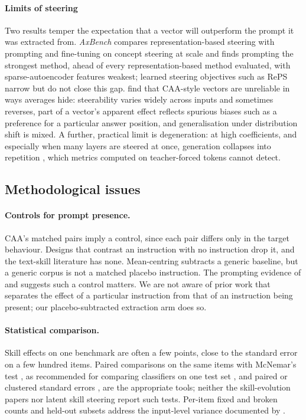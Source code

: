 \documentclass[11pt]{article}
\begin{document}
\paragraph{Limits of steering} Two results temper the expectation that a vector will outperform the
prompt it was extracted from. \emph{AxBench} \citep{wu2025axbench} compares representation-based
steering with prompting and fine-tuning on concept steering at scale and finds prompting the
strongest method, ahead of every representation-based method evaluated, with sparse-autoencoder
features weakest; learned steering objectives such as RePS \citep{wu2025reps} narrow but do not close
this gap. \citet{tan2024reliability} find that CAA-style vectors are unreliable in ways averages
hide: steerability varies widely across inputs and sometimes reverses, part of a vector's apparent
effect reflects spurious biases such as a preference for a particular answer position, and
generalisation under distribution shift is mixed. A further, practical limit is degeneration: at
high coefficients, and especially when many layers are steered at once, generation collapses into
repetition \citep{turner2023actadd,panickssery2024caa}, which metrics computed on teacher-forced
tokens cannot detect.

\subsection{Methodological issues}

\paragraph{Controls for prompt presence.} CAA's matched pairs imply a control, since each pair
differs only in the target behaviour. Designs that contrast an instruction with no instruction
\citep{stolfo2025instruction} drop it, and the text-skill literature has none. Mean-centring
\citep{jorgensen2023meancentring} subtracts a generic baseline, but a generic corpus is not a matched
placebo instruction. The prompting evidence of \citet{webson2022prompts} and
\citet{sclar2024formatting} suggests such a control matters. We are not aware of prior work that
separates the effect of a particular instruction from that of an instruction being present; our
placebo-subtracted extraction arm does so.

\paragraph{Statistical comparison.} Skill effects on one benchmark are often a few points, close to
the standard error on a few hundred items. Paired comparisons on the same items with McNemar's test
\citep{mcnemar1947}, as recommended for comparing classifiers on one test set
\citep{dietterich1998}, and paired or clustered standard errors \citep{miller2024errorbars}, are the
appropriate tools; neither the skill-evolution papers nor latent skill steering report such tests.
Per-item fixed and broken counts and held-out subsets address the input-level variance documented by
\citet{tan2024reliability}.
\end{document}
